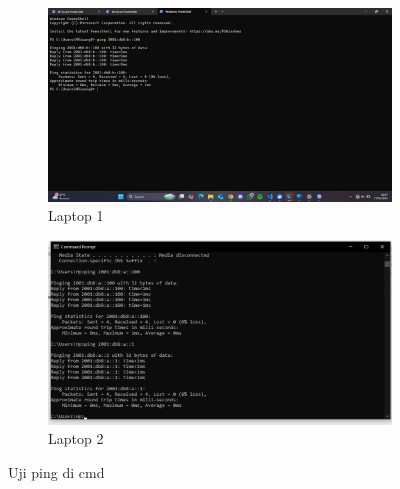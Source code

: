 \begin{figure}[H]
    \centering
    \begin{subfigure}[b]{0.3\linewidth}
      \centering
      \includegraphics[width=\linewidth]{image/statis10.jpg}
      \caption{Laptop 1}
    \end{subfigure}
    \hspace{1cm}
    \begin{subfigure}[b]{0.3\linewidth}
      \centering
      \includegraphics[width=\linewidth]{image/statis9.png}
      \caption{Laptop 2}
    \end{subfigure}
    \caption{Uji ping di cmd}
\end{figure}


